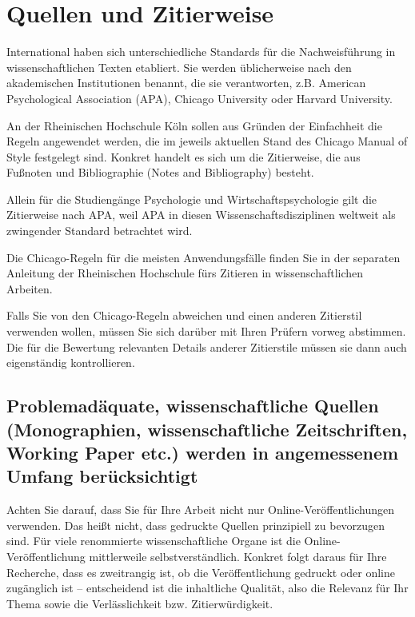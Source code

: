 \chapter{Quellen und Zitierweise}
\label{chap:quellen-zitierweise}

International haben sich unterschiedliche Standards für die Nachweisführung in wissenschaftlichen Texten etabliert. Sie werden üblicherweise nach den akademischen Institutionen benannt, die sie verantworten, z.B. American Psychological Association (APA), Chicago University oder Harvard University.

An der Rheinischen Hochschule Köln sollen aus Gründen der Einfachheit die Regeln angewendet werden, die im jeweils aktuellen Stand des Chicago Manual of Style festgelegt sind. Konkret handelt es sich um die Zitierweise, die aus Fußnoten und Bibliographie (Notes and Bibliography) besteht.

Allein für die Studiengänge Psychologie und Wirtschaftspsychologie gilt die Zitierweise nach APA, weil APA in diesen Wissenschaftsdisziplinen weltweit als zwingender Standard betrachtet wird.

Die Chicago-Regeln für die meisten Anwendungsfälle finden Sie in der separaten Anleitung der Rheinischen Hochschule fürs Zitieren in wissenschaftlichen Arbeiten.

Falls Sie von den Chicago-Regeln abweichen und einen anderen Zitierstil verwenden wollen, müssen Sie sich darüber mit Ihren Prüfern vorweg abstimmen. Die für die Bewertung relevanten Details anderer Zitierstile müssen sie dann auch eigenständig kontrollieren.

\section{Problemadäquate, wissenschaftliche Quellen (Monographien, wissenschaftliche Zeitschriften, Working Paper etc.) werden in angemessenem Umfang berücksichtigt}
\label{sec:wissenschaftliche-quellen}

Achten Sie darauf, dass Sie für Ihre Arbeit nicht nur Online-Veröffentlichungen verwenden. Das heißt nicht, dass gedruckte Quellen prinzipiell zu bevorzugen sind. Für viele renommierte wissenschaftliche Organe ist die Online-Veröffentlichung mittlerweile selbstverständlich. Konkret folgt daraus für Ihre Recherche, dass es zweitrangig ist, ob die Veröffentlichung gedruckt oder online zugänglich ist – entscheidend ist die inhaltliche Qualität, also die Relevanz für Ihr Thema sowie die Verlässlichkeit bzw. Zitierwürdigkeit.

